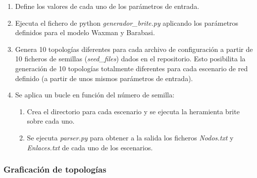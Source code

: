 \begin{enumerate}
    \item Define los valores de cada uno de los parámetros de entrada.
    \item Ejecuta el fichero de python \textit{generador\_brite.py} aplicando los parámetros definidos para el modelo Waxman y Barabasi.
    \item Genera 10 topologías diferentes para cada archivo de configuración a partir de 10 ficheros de semillas (\textit{seed\_files}) dados en el repositorio. Esto posibilita la generación de 10 topologías totalmente diferentes para cada escenario de red definido (a partir de unos mismos parámetros de entrada). 
    \item Se aplica un bucle en función del número de semilla:
    \begin{enumerate} 
        \item Crea el directorio para cada escenario y se ejecuta la heramienta \gls{brite} sobre cada uno.
        \item Se ejecuta \textit{parser.py} para obtener a la salida los ficheros \textit{Nodos.txt} y \textit{Enlaces.txt} de cada uno de los escenarios.   
    \end{enumerate} 
\end{enumerate}

\subsubsection{Graficación de topologías}
